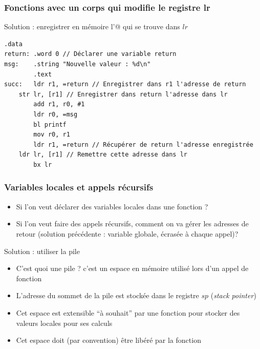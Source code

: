\documentclass{beamer}
\begin{document}
\begin{frame}[fragile]
\frametitle{Fonctions avec un corps qui modifie le registre lr}

\begin{block}{Solution : enregistrer en mémoire l'@ qui se trouve dans $lr$}
{\small
\begin{lstlisting}[style=arm]
        .data
return: .word 0 // Déclarer une variable return
msg:    .string "Nouvelle valeur : %d\n"
        .text
succ:   ldr r1, =return // Enregistrer dans r1 l'adresse de return
	str lr, [r1] // Enregistrer dans return l'adresse dans lr
        add r1, r0, #1
        ldr r0, =msg  
        bl printf
        mov r0, r1
        ldr r1, =return // Récupérer de return l'adresse enregistrée
	ldr lr, [r1] // Remettre cette adresse dans lr
        bx lr     
      \end{lstlisting}}
\end{block}
\end{frame}

\begin{frame}
\frametitle{Variables locales et appels récursifs}
  \begin{itemize}
  \item Si l'on veut déclarer des variables locales dans une fonction ?
  \item Si l'on veut faire des appels récursifs, comment on va gérer
    les adresses de retour (solution précédente : variable globale,
    écrasée à chaque appel)?
  \end{itemize}

\begin{block}{Solution : utiliser la pile}
  \begin{itemize}
  \item C'est quoi une pile ? c'est un espace en mémoire utilisé lors
    d'un appel de fonction
  \item L'adresse du sommet de la pile est stockée dans le registre
    $sp$ (\textit{stack pointer})
  \item Cet espace est extensible ``à souhait'' par une fonction pour
    stocker des valeurs locales pour ses calculs
  \item Cet espace doit (par convention) être libéré par la fonction
  \end{itemize}
\end{block}
\end{frame}
\end{document}
